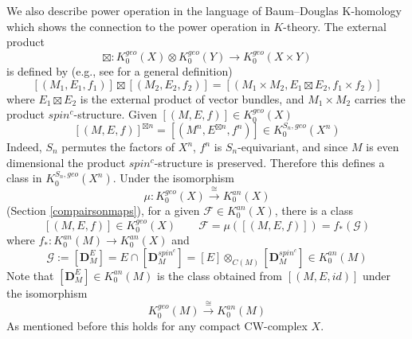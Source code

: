 \documentclass[11pt,leqno,twoside]{amsart}
\theoremstyle{plainsl}
\theoremstyle{definition}
\newcommand{\bD}{\mathbf{D}}
\begin{document}
We also describe power operation in the language of Baum–Douglas K-homology which shows the connection to the power operation in $K$-theory. The external product
 \begin{equation}\label{external_kasparov_product_baumdouglass}
     \boxtimes:K^{geo}_0(X)\otimes K^{geo}_0(Y)\rightarrow K^{geo}_{0}(X\times Y)
 \end{equation}
 is defined by (e.g., see \cite[\S~3.1]{J} for a general definition)
 \[[(M_1,E_1,f_1)]\boxtimes [(M_2,E_2,f_2)]=[(M_1\times M_2,E_1\boxtimes E_2,f_1\times f_2)]\]
 where $E_1\boxtimes E_2$ is the external product of vector bundles, and $M_1\times M_2$ carries the product $spin^c$-structure.  Given  $[(M,E,f)]\in K_0^{geo}(X)$
 \[[(M,E,f)]^{\boxtimes n}=[(M^n,E^{\boxtimes n},f^n)]\in K_0^{S_n,geo}(X^n)\]
 Indeed, $S_n$ permutes the factors of $X^n$, $f^n$ is $S_n$-equivariant, and since $M$ is even dimensional the product $spin^c$-structure is preserved. Therefore this defines a class in $K_0^{S_n,geo}(X^n)$. Under the isomorphism
\begin{equation}\label{an_bdmapinsec7}
    \mu:K_0^{geo}(X) \xrightarrow{\cong} K_0^{an}(X)
\end{equation} 
 (Section \ref{compairsonmaps}), for a given   $\mathcal{F}\in K_0^{an}(X)$,  there is a class 
 \begin{equation}\label{f=g,bm=kk}
   [(M,E,f)]\in K_0^{geo}(X)\qquad  \mathcal{F}=\mu([(M,E,f)])=f_*(\mathcal{G})
 \end{equation}
where $f_*:K_0^{an}(M) \rightarrow K_0^{an}(X)$ and
$$\mathcal{G}:=[\bD_M^E]=E\cap[\bD_M^{spin^c}]=[E]\otimes_{C(M)}[\bD_M^{spin^c}] \in K_0^{an}(M)$$ Note that $[\bD_M^E]\in K_0^{an}(M)$ is the class obtained from  $[(M,E,id)]$  under the isomorphism $$ K_0^{geo}(M) \xrightarrow{\cong} K_0^{an}(M)$$
 As mentioned before this  holds for any compact CW-complex $X$. 
 
\end{document}
